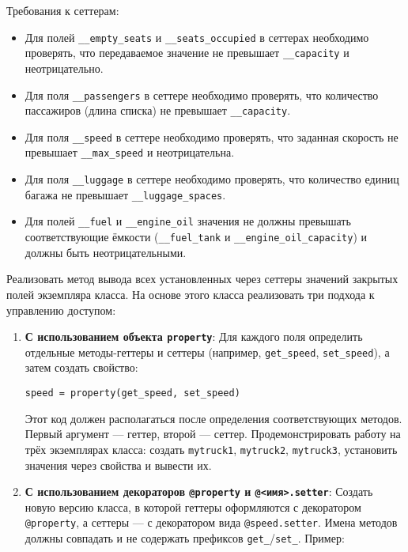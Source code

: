 \begin{enumerate}
\begin{itemize}
\end{itemize}
Требования к сеттерам:
\begin{itemize}
    \item Для полей \texttt{\_\_empty\_seats} и \texttt{\_\_seats\_occupied} в сеттерах необходимо проверять, что передаваемое значение не превышает \texttt{\_\_capacity} и неотрицательно.  
    \item Для поля \texttt{\_\_passengers} в сеттере необходимо проверять, что количество пассажиров (длина списка) не превышает \texttt{\_\_capacity}.  
    \item Для поля \texttt{\_\_speed} в сеттере необходимо проверять, что заданная скорость не превышает \texttt{\_\_max\_speed} и неотрицательна.  
    \item Для поля \texttt{\_\_luggage} в сеттере необходимо проверять, что количество единиц багажа не превышает \texttt{\_\_luggage\_spaces}.
    \item Для полей \texttt{\_\_fuel} и \texttt{\_\_engine\_oil} значения не должны превышать соответствующие ёмкости (\texttt{\_\_fuel\_tank} и \texttt{\_\_engine\_oil\_capacity}) и должны быть неотрицательными.
\end{itemize}
Реализовать метод вывода всех установленных через сеттеры значений закрытых полей экземпляра класса.
На основе этого класса реализовать три подхода к управлению доступом:
\begin{enumerate}
    \item \textbf{С использованием объекта \texttt{property}}:  
    Для каждого поля определить отдельные методы-геттеры и сеттеры (например, \texttt{get\_speed}, \texttt{set\_speed}), а затем создать свойство:  
    \begin{verbatim}
speed = property(get_speed, set_speed)
    \end{verbatim}  
    Этот код должен располагаться после определения соответствующих методов. Первый аргумент — геттер, второй — сеттер.  
    Продемонстрировать работу на трёх экземплярах класса: создать \texttt{mytruck1}, \texttt{mytruck2}, \texttt{mytruck3}, установить значения через свойства и вывести их.
    \item \textbf{С использованием декораторов \texttt{@property} и \texttt{@<имя>.setter}}:  
    Создать новую версию класса, в которой геттеры оформляются с декоратором \texttt{@property}, а сеттеры — с декоратором вида \texttt{@speed.setter}. Имена методов должны совпадать и не содержать префиксов \texttt{get\_}/\texttt{set\_}.  
    Пример:  
    \begin{verbatim}

\end{verbatim}
\end{enumerate}
\end{enumerate}
